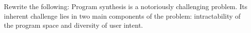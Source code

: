 Rewrite the following:
Program synthesis is a notoriously challenging problem. Its inherent challenge lies in two main components of the problem: intractability of the program space and diversity of user intent.



